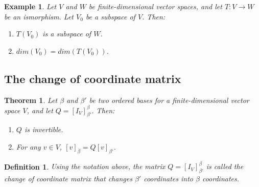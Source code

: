 \documentclass[a4paper]{article}
\newtheorem{mytheorem}{Theorem}
\newtheorem{example}{Example}
\newtheorem{mydef}{Definition}
\numberwithin{mytheorem}{section}
\numberwithin{mydef}{section}
\numberwithin{example}{section}
\begin{document}
\begin{example} Let $V$ and $W$ be finite-dimensional vector spaces, and let $T: V \rightarrow W$ be an ismorphism. Let $V_{0}$ be a subspace of $V$. Then:
\begin{enumerate} 
\item $T(V_{0})$ is a subspace of $W$.
\item $dim(V_{0}) = dim(T(V_{0}))$.
\end{enumerate}
\end{example}

\subsection{The change of coordinate matrix}

\begin{mytheorem} Let $\beta$ and $\beta'$ be two ordered bases for a finite-dimensional vector space $V$, and let $Q = [I_{V}]^{\beta}_{\beta'}$. Then:
\begin{enumerate} 
\item $Q$ is invertible.
\item For any $v \in V$, $[v]_{\beta} = Q[v]_{\beta'}$.
\end{enumerate}
\end{mytheorem}

\begin{mydef} Using the notation above, the matrix $Q = [I_{V}]^{\beta}_{\beta'}$ is called the change of coordinate matrix that changes $\beta'$ coordinates into $\beta$ coordinates.
\end{mydef}

\end{document}
